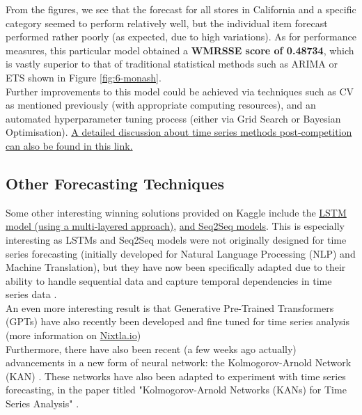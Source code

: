 \documentclass[12pt]{article}
\begin{document}
\noindent From the figures, we see that the forecast for all stores in California and a specific category seemed to perform relatively well, but the individual item forecast performed rather poorly (as expected, due to high variations). As for performance measures, this particular model obtained a \textbf{WMRSSE score of 0.48734}, which is vastly superior to that of traditional statistical methods such as ARIMA or ETS shown in Figure \ref{fig:6-monash}. \\ 

\noindent Further improvements to this model could be achieved via techniques such as CV as mentioned previously (with appropriate computing resources), and an automated hyperparameter tuning process (either via Grid Search or Bayesian Optimisation). \href{https://www.kaggle.com/c/m5-forecasting-accuracy/discussion/166814}{A detailed discussion about time series methods post-competition can also be found in this link.}

\subsection*{Other Forecasting Techniques}

Some other interesting winning solutions provided on Kaggle include the \href{https://www.kaggle.com/code/omershect/learning-pytorch-lstm-deep-learning-with-m5-data}{LSTM model (using a multi-layered approach)}, \href{https://www.kaggle.com/code/omershect/learning-pytorch-seq2seq-with-m5-data-set}{and Seq2Seq models}. This is especially interesting as LSTMs and Seq2Seq models were not originally designed for time series forecasting (initially developed for Natural Language Processing (NLP) and Machine Translation), but they have now been specifically adapted due to their ability to handle sequential data and capture temporal dependencies in time series data \cite{Olah_2015}. \\ 

\noindent An even more interesting result is that Generative Pre-Trained Transformers (GPTs) have also recently been developed and fine tuned for time series analysis \cite{garza2023timegpt1} \cite{liao2024timegpt} (more information on \href{https://docs.nixtla.io/}{Nixtla.io}) \\

\noindent Furthermore, there have also been recent (a few weeks ago actually) advancements in a new form of neural network: the Kolmogorov-Arnold Network (KAN) \cite{liu2024kan}. These networks have also been adapted to experiment with time series forecasting, in the paper titled "Kolmogorov-Arnold Networks (KANs) for Time Series Analysis" \cite{vacarubio2024kolmogorovarnold}. 
\end{document}
